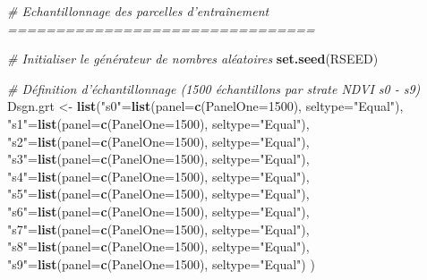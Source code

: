 \documentclass[a4paper, notitlepage, 12pt, krantz2]{krantz}
\newenvironment{Shaded}{\begin{snugshade}}{\end{snugshade}}
\newcommand{\CommentTok}[1]{\textcolor[rgb]{0.56,0.35,0.01}{\textit{#1}}}
\newcommand{\DataTypeTok}[1]{\textcolor[rgb]{0.13,0.29,0.53}{#1}}
\newcommand{\DecValTok}[1]{\textcolor[rgb]{0.00,0.00,0.81}{#1}}
\newcommand{\KeywordTok}[1]{\textcolor[rgb]{0.13,0.29,0.53}{\textbf{#1}}}
\newcommand{\NormalTok}[1]{#1}
\newcommand{\StringTok}[1]{\textcolor[rgb]{0.31,0.60,0.02}{#1}}
\begin{document}
\begin{Shaded}
\begin{Highlighting}[]
\CommentTok{# Echantillonnage des parcelles d'entraînement ================================}

\CommentTok{# Initialiser le générateur de nombres aléatoires}
\KeywordTok{set.seed}\NormalTok{(RSEED)}

\CommentTok{# Définition d'échantillonnage (1500 échantillons par strate NDVI s0 - s9)}
\NormalTok{Dsgn.grt <-}\StringTok{ }\KeywordTok{list}\NormalTok{(}\StringTok{"s0"}\NormalTok{=}\KeywordTok{list}\NormalTok{(}\DataTypeTok{panel=}\KeywordTok{c}\NormalTok{(}\DataTypeTok{PanelOne=}\DecValTok{1500}\NormalTok{), }\DataTypeTok{seltype=}\StringTok{"Equal"}\NormalTok{),}
                 \StringTok{"s1"}\NormalTok{=}\KeywordTok{list}\NormalTok{(}\DataTypeTok{panel=}\KeywordTok{c}\NormalTok{(}\DataTypeTok{PanelOne=}\DecValTok{1500}\NormalTok{), }\DataTypeTok{seltype=}\StringTok{"Equal"}\NormalTok{),}
                 \StringTok{"s2"}\NormalTok{=}\KeywordTok{list}\NormalTok{(}\DataTypeTok{panel=}\KeywordTok{c}\NormalTok{(}\DataTypeTok{PanelOne=}\DecValTok{1500}\NormalTok{), }\DataTypeTok{seltype=}\StringTok{"Equal"}\NormalTok{),}
                 \StringTok{"s3"}\NormalTok{=}\KeywordTok{list}\NormalTok{(}\DataTypeTok{panel=}\KeywordTok{c}\NormalTok{(}\DataTypeTok{PanelOne=}\DecValTok{1500}\NormalTok{), }\DataTypeTok{seltype=}\StringTok{"Equal"}\NormalTok{),}
                 \StringTok{"s4"}\NormalTok{=}\KeywordTok{list}\NormalTok{(}\DataTypeTok{panel=}\KeywordTok{c}\NormalTok{(}\DataTypeTok{PanelOne=}\DecValTok{1500}\NormalTok{), }\DataTypeTok{seltype=}\StringTok{"Equal"}\NormalTok{),}
                 \StringTok{"s5"}\NormalTok{=}\KeywordTok{list}\NormalTok{(}\DataTypeTok{panel=}\KeywordTok{c}\NormalTok{(}\DataTypeTok{PanelOne=}\DecValTok{1500}\NormalTok{), }\DataTypeTok{seltype=}\StringTok{"Equal"}\NormalTok{),}
                 \StringTok{"s6"}\NormalTok{=}\KeywordTok{list}\NormalTok{(}\DataTypeTok{panel=}\KeywordTok{c}\NormalTok{(}\DataTypeTok{PanelOne=}\DecValTok{1500}\NormalTok{), }\DataTypeTok{seltype=}\StringTok{"Equal"}\NormalTok{),}
                 \StringTok{"s7"}\NormalTok{=}\KeywordTok{list}\NormalTok{(}\DataTypeTok{panel=}\KeywordTok{c}\NormalTok{(}\DataTypeTok{PanelOne=}\DecValTok{1500}\NormalTok{), }\DataTypeTok{seltype=}\StringTok{"Equal"}\NormalTok{),}
                 \StringTok{"s8"}\NormalTok{=}\KeywordTok{list}\NormalTok{(}\DataTypeTok{panel=}\KeywordTok{c}\NormalTok{(}\DataTypeTok{PanelOne=}\DecValTok{1500}\NormalTok{), }\DataTypeTok{seltype=}\StringTok{"Equal"}\NormalTok{),}
                 \StringTok{"s9"}\NormalTok{=}\KeywordTok{list}\NormalTok{(}\DataTypeTok{panel=}\KeywordTok{c}\NormalTok{(}\DataTypeTok{PanelOne=}\DecValTok{1500}\NormalTok{), }\DataTypeTok{seltype=}\StringTok{"Equal"}\NormalTok{)}
\NormalTok{)}


\end{Highlighting}
\end{Shaded}
\end{document}
